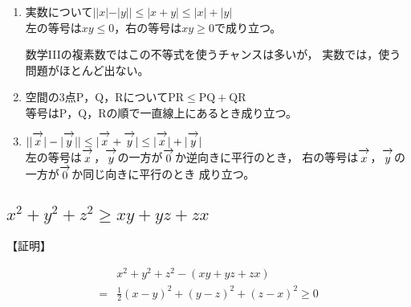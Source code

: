 \documentclass[autodetect-engine,ja=standard, 10.5pt, a4paper, titlepage]{bxjsarticle}
\renewcommand{\v}[1]{\overrightarrow{\mathstrut{#1}}}
\renewcommand{\rm}[1]{\mathrm{#1}}
\numberwithin{equation}{section} %
\begin{document}
\begin{enumerate}[1.]
  \item 
  実数について$||x|-|y||\leq |x+y|\leq |x|+|y|$\\
  左の等号は$xy\leq 0$，右の等号は$xy\geq 0$で成り立つ。

  数学I\!I\!Iの複素数ではこの不等式を使うチャンスは多いが，
  実数では，使う問題がほとんど出ない。\\
  
  \item 
  空間の3点$\rm{P}$，$\rm{Q}$，$\rm{R}$について$\rm{PR}\leq \rm{PQ} + \rm{QR}$\\
  等号は$\rm{P}$，$\rm{Q}$，$\rm{R}$の順で一直線上にあるとき成り立つ。\\
  
  \item 
  $||\v{x}|-|\v{y}|| \leq |\v{x} + \v{y}| \leq |\v{x}| + |\v{y}|$\\
  左の等号は$\v{x}$，$\v{y}$の一方が$\v{0}$か逆向きに平行のとき，
  右の等号は$\v{x}$，$\v{y}$の一方が$\v{0}$か同じ向きに平行のとき
  成り立つ。
\end{enumerate}

\subsection{$x^2 + y^2 + z^2 \geq xy + yz + zx$}
【証明】
\begin{fleqn}[20pt]
  \begin{align*}
    & x^2 + y^2 + z^2 - (xy + yz + zx)\\
    =& \frac{1}{2} {(x-y)^2 + (y-z)^2 + (z-x)^2} \geq 0
  \end{align*}
\end{fleqn}
\end{document}
